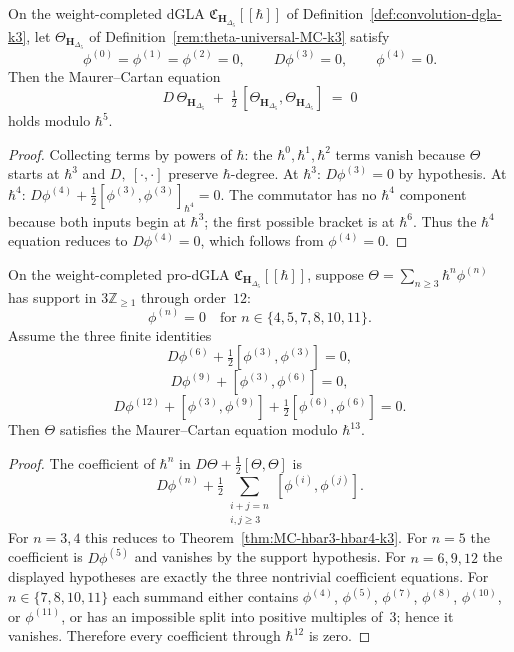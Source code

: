 \begin{theorem}
\label{thm:MC-hbar3-hbar4-k3}
On the weight-completed dGLA
$\mathfrak{C}_{\mathbf{H}_{\Delta_5}}[[\hbar]]$ of
Definition~\ref{def:convolution-dgla-k3}, let
$\Theta_{\mathbf{H}_{\Delta_5}}$ of
Definition~\ref{rem:theta-universal-MC-k3} satisfy
\[
\phi^{(0)}=\phi^{(1)}=\phi^{(2)}=0,\qquad
D\phi^{(3)}=0,\qquad \phi^{(4)}=0.
\]
Then the Maurer--Cartan equation
\[
 D\,\Theta_{\mathbf{H}_{\Delta_5}} \;+\; \tfrac{1}{2}\,
 [\Theta_{\mathbf{H}_{\Delta_5}},\Theta_{\mathbf{H}_{\Delta_5}}]
 \;=\; 0
\]
holds modulo $\hbar^5$.
\end{theorem}

\begin{proof}
Collecting terms by powers of $\hbar$: the $\hbar^0,\hbar^1,\hbar^2$
terms vanish because $\Theta$ starts at $\hbar^3$ and $D,\ [\cdot,\cdot]$
preserve $\hbar$-degree. At $\hbar^3$:
$D\phi^{(3)} = 0$ by hypothesis.
At $\hbar^4$: $D\phi^{(4)} + \tfrac{1}{2}[\phi^{(3)},\phi^{(3)}]_{\hbar^4}
= 0$. The commutator has no $\hbar^4$ component because both inputs
begin at $\hbar^3$; the first possible bracket is at $\hbar^6$.
Thus the $\hbar^4$ equation reduces to $D\phi^{(4)}=0$, which follows
from $\phi^{(4)}=0$.
\end{proof}

\begin{theorem}
\label{thm:MC-hbar7-hbar12-k3}
On the weight-completed pro-dGLA
$\mathfrak{C}_{\mathbf{H}_{\Delta_5}}[[\hbar]]$, suppose
$\Theta=\sum_{n\ge3}\hbar^n\phi^{(n)}$ has support in
$3\mathbb Z_{\ge1}$ through order~$12$:
\[
\phi^{(n)}=0
\quad
\text{for } n\in\{4,5,7,8,10,11\}.
\]
Assume the three finite identities
\[
D\phi^{(6)}+\tfrac12[\phi^{(3)},\phi^{(3)}]=0,
\]
\[
D\phi^{(9)}+[\phi^{(3)},\phi^{(6)}]=0,
\]
\[
D\phi^{(12)}+[\phi^{(3)},\phi^{(9)}]
+\tfrac12[\phi^{(6)},\phi^{(6)}]=0.
\]
Then $\Theta$ satisfies the Maurer--Cartan equation modulo
$\hbar^{13}$.
\end{theorem}

\begin{proof}
The coefficient of $\hbar^n$ in
$D\Theta+\tfrac12[\Theta,\Theta]$ is
\[
D\phi^{(n)}
+\tfrac12\sum_{\substack{i+j=n\\ i,j\ge3}}
[\phi^{(i)},\phi^{(j)}].
\]
For $n=3,4$ this reduces to
Theorem~\ref{thm:MC-hbar3-hbar4-k3}. For $n=5$ the coefficient is
$D\phi^{(5)}$ and vanishes by the support hypothesis.
For $n=6,9,12$ the displayed hypotheses are exactly the three
nontrivial coefficient equations. For
$n\in\{7,8,10,11\}$ each summand either contains
$\phi^{(4)}$, $\phi^{(5)}$, $\phi^{(7)}$, $\phi^{(8)}$,
$\phi^{(10)}$, or $\phi^{(11)}$, or has an impossible split into
positive multiples of~$3$; hence it vanishes. Therefore every
coefficient through $\hbar^{12}$ is zero.
\end{proof}

